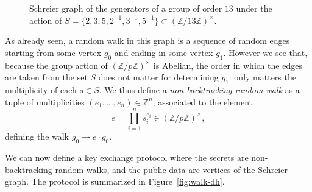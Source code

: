 \documentclass[10pt]{article}
\theoremstyle{plain}
\theoremstyle{definition}
\begin{document}
\begin{prposition}
\begin{figure}
  \caption{Schreier graph of the generators of a group of order $13$
    under the action of
    $S=\{2,3,5,2^{-1},3^{-1},5^{-1}\}⊂(ℤ/13ℤ)^{×}$.}
  \label{fig:schreier}
\end{figure}

As already seen, a random walk in this graph is a sequence of random
edges starting from some vertex $g_0$ and ending in some vertex
$g_1$. %
However we see that, because the group action of $(ℤ/pℤ)^×$ is
Abelian, the order in which the edges are taken from the set $S$ does
not matter for determining $g_1$: only matters the multiplicity of
each $s∈S$. %
We thus define a \emph{non-backtracking random walk} as a tuple of
multiplicities $(e_1,\dots,e_n)∈ℤ^n$, associated to the element
\[e = \prod_{i=1}^n s_i^{e_i} ∈ (ℤ/pℤ)^×,\]
defining the walk $g_0→e·g_0$. %

We can now define a key exchange protocol where the secrets are
non-backtracking random walks, and the public data are vertices of the
Schreier graph. %
The protocol is summarized in Figure~\ref{fig:walk-dh}.


\end{prposition}
\end{document}
